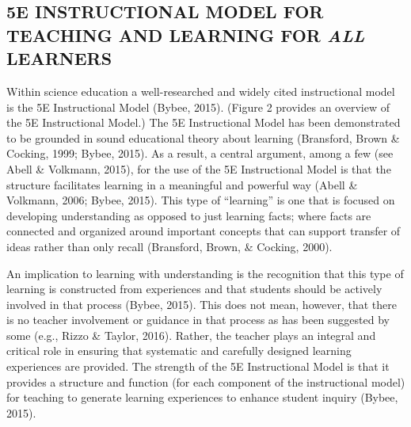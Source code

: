 \documentclass[11.5pt]{sig-alternate} %
\begin{document}
\begin{large}
\section*{5E INSTRUCTIONAL MODEL FOR TEACHING AND LEARNING FOR \textit{ALL} LEARNERS}

Within science education a well-researched and widely cited instructional model is the 5E Instructional Model (Bybee, 2015). (Figure 2 provides an overview of the 5E Instructional Model.) The 5E Instructional Model has been demonstrated to be grounded in sound educational theory about learning (Bransford, Brown \& Cocking, 1999; Bybee, 2015). As a result, a central argument, among a few (see Abell \& Volkmann, 2015), for the use of the 5E Instructional Model is that the structure facilitates learning in a meaningful and powerful way (Abell \& Volkmann, 2006; Bybee, 2015). This type of “learning” is one that is focused on developing understanding as opposed to just learning facts; where facts are connected and organized around important concepts that can support transfer of ideas rather than only recall (Bransford, Brown, \& Cocking, 2000). 

An implication to learning with understanding is the recognition that this type of learning is constructed from experiences and that students should be actively involved in that process (Bybee, 2015). This does not mean, however, that there is no teacher involvement or guidance in that process as has been suggested by some (e.g., Rizzo \& Taylor, 2016). Rather, the teacher plays an integral and critical role in ensuring that systematic and carefully designed learning experiences are provided. The strength of the 5E Instructional Model is that it provides a structure and function (for each component of the instructional model) for teaching to generate learning experiences to enhance student inquiry (Bybee, 2015). 


\end{large}
\end{document}
